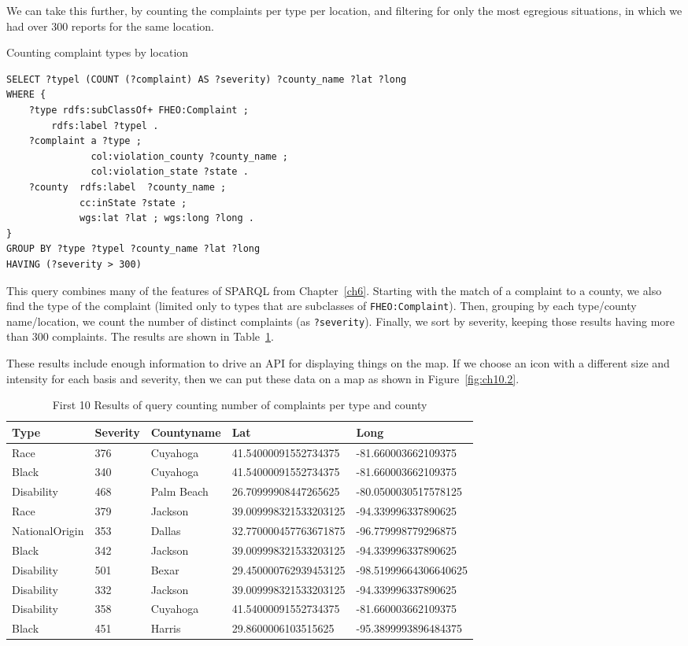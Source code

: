 We can take this further, by counting the complaints per type per location, 
and filtering for only the most egregious situations, in which we had 
over 300 reports for the same location.  

\begin{query}Counting complaint types by location\end{query}
\begin{lstlisting}
SELECT ?typel (COUNT (?complaint) AS ?severity) ?county_name ?lat ?long
WHERE {    
    ?type rdfs:subClassOf+ FHEO:Complaint ;
        rdfs:label ?typel .
    ?complaint a ?type ;
               col:violation_county ?county_name ;
               col:violation_state ?state .
    ?county  rdfs:label  ?county_name ;
             cc:inState ?state ;
             wgs:lat ?lat ; wgs:long ?long .
}
GROUP BY ?type ?typel ?county_name ?lat ?long
HAVING (?severity > 300)
\end{lstlisting}

This query combines many of the features of SPARQL from Chapter~\ref{ch6}.
Starting with the match of a complaint to a county, we also find the
type of the complaint (limited only to types that are subclasses of
\texttt{FHEO:Complaint}). Then, grouping by each type/county name/location, we count the
number of distinct complaints (as \texttt{?severity}). Finally, we sort by
severity, keeping those results having more than 300 complaints. The
results are shown in Table~\ref{tab:ch10.2}.

These results include enough information to drive an API for displaying
things on the map. If we choose an icon with a different size and
intensity for each basis and severity, then we can put these data on a
map as shown in Figure~\ref{fig:ch10.2}.

\begin{table}
\caption{First 10 Results of query counting number of complaints per type and county}
\label{tab:ch10.2}
\begin{tabular}{|lllll|}
\hline
Type&Severity&Countyname&Lat&Long\\
\hline
Race&376&Cuyahoga&41.54000091552734375&-81.660003662109375\\
Black&340&Cuyahoga&41.54000091552734375&-81.660003662109375\\
Disability&468&Palm Beach&26.70999908447265625&-80.0500030517578125\\
Race&379&Jackson&39.009998321533203125&-94.339996337890625\\
NationalOrigin&353&Dallas&32.770000457763671875&-96.779998779296875\\
Black&342&Jackson&39.009998321533203125&-94.339996337890625\\
Disability&501&Bexar&29.450000762939453125&-98.51999664306640625\\
Disability&332&Jackson&39.009998321533203125&-94.339996337890625\\
Disability&358&Cuyahoga&41.54000091552734375&-81.660003662109375\\
Black&451&Harris&29.8600006103515625&-95.3899993896484375\\
\hline
\end{tabular}
\end{table}


